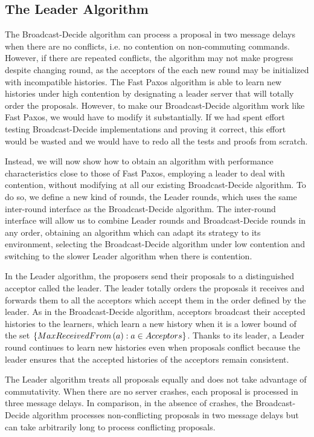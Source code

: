 \subsection{The Leader Algorithm} 
\label{sec:leader}

The Broadcast-Decide algorithm can process a proposal in two message delays when there are no conflicts, i.e. no contention on non-commuting commands. However, if there are repeated conflicts, the algorithm may not make progress despite changing round, as the acceptors of the each new round
may be initialized with incompatible histories. The Fast Paxos algorithm \cite{Lamport06FastPaxos} is able to learn new histories under high contention by
designating a leader server that will totally order the proposals. However, to make our Broadcast-Decide algorithm work like Fast Paxos, we would have to modify it substantially. If we had spent effort testing Broadcast-Decide implementations and proving it correct, this effort would be wasted and we would have to redo all the tests and proofs from scratch.

Instead, we will now show how to obtain an algorithm with performance characteristics close to those of Fast Paxos, employing a leader to deal with contention, without modifying at all our existing Broadcast-Decide algorithm.
To do so, we define a new kind of rounds, the Leader rounds, which uses the same inter-round interface as the Broadcast-Decide algorithm. 
The inter-round interface will allow us to combine Leader rounds and Broadcast-Decide rounds in any order, obtaining an algorithm which can adapt its strategy to its environment, selecting the Broadcast-Decide algorithm under low contention and switching to the slower Leader algorithm when there is contention.

In the Leader algorithm, the proposers send their proposals to a distinguished acceptor called the leader. 
The leader totally orders the proposals it receives and forwards them to all the acceptors which accept them in the order defined by the leader.
As in the Broadcast-Decide algorithm, acceptors broadcast their accepted histories to the learners, which learn a new history when it is a lower bound of 
the set $\left\{MaxReceivedFrom\left( a \right) : a \in Acceptors\right\}$.
Thanks to its leader, a Leader round continues to learn new histories even when proposals conflict because the leader ensures that the accepted histories of the acceptors remain consistent. 

The Leader algorithm treats all proposals equally and does not take advantage of commutativity. When there are no server crashes, each proposal is processed in three message delays. In comparison, in the absence of crashes, the Broadcast-Decide algorithm processes non-conflicting proposals in two message delays but can take arbitrarily long to process conflicting proposals.


